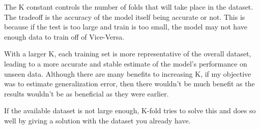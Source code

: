 \documentclass[12pt]{article}
\begin{document}
\begin{enumerate}


The K constant controls the number of folds that will take place in the dataset. The tradeoff is the accuracy of the model itself being accurate or not. This is because if the test is too large and train is too small, the model may not have enough data to train off of Vice-Versa.


With a larger K, each training set is more representative of the overall dataset, leading to a more accurate and stable estimate of the model's performance on unseen data. Although there are many benefits to increasing K, if my objective was to estimate generalization error, then there wouldn't be much benefit as the results wouldn't be as beneficial as they were earlier.


If the available dataset is not large enough, K-fold tries to solve this and does so well by giving a solution with the dataset you already have.



\end{enumerate}
\end{document}
